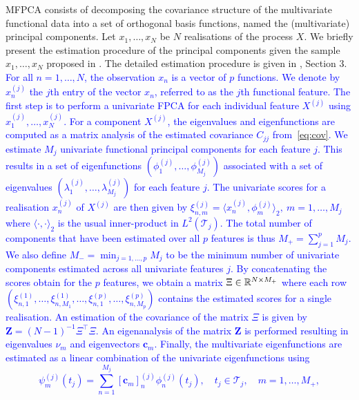 {MFPCA consists of decomposing the covariance structure of the multivariate functional data into a set of orthogonal basis functions, named the (multivariate) principal components. Let $x_1, \dots, x_N$ be $N$ realisations of the process $X$. We briefly present the estimation procedure of the principal components given the sample $x_1, \dots, x_N$ proposed in \cite{happMultivariateFunctionalPrincipal2018}.} The detailed estimation procedure is given in \cite{happMultivariateFunctionalPrincipal2018}, Section 3. \textcolor{blue}{For all $n = 1, \dots, N$, the observation $x_n$ is a vector of $p$ functions. We denote by $x_n^{(j)}$ the $j$th entry of the vector $x_n$, referred to as the $j$th functional feature. The first step is to perform a univariate FPCA for each individual feature $X^{(j)}$ using $x_1^{(j)}, \dots, x_N^{(j)}$. For a component $X^{(j)}$, the eigenvalues and eigenfunctions are computed as a matrix analysis of the estimated covariance $C_{jj}$ from~\eqref{eq:cov}. We estimate $M_j$ univariate functional principal components for each feature $j$. This results in a set of eigenfunctions $(\phi^{(j)}_{1}, \ldots, \phi^{(j)}_{M_j})$ associated with a set of eigenvalues $(\lambda^{(j)}_1, \ldots, \lambda^{(j)}_{M_j})$ for each feature $j$. The univariate scores for a realisation $x^{(j)}_n$ of $X^{(j)}$ are then given by $\xi^{(j)}_{n, m} = \langle  x^{(j)}_n, \phi^{(j)}_m \rangle_2,~m = 1, \ldots, M_j$ where $\langle \cdot, \cdot\rangle_2$ is the usual inner-product in $L^2(\mathcal{T}_j)$. The total number of components that have been estimated over all $p$ features is thus $M_+ = \sum_{j = 1}^p M_j$. We also define $M_{-} = \min_{j = 1, \dots, p} M_j$ to be the minimum number of univariate components estimated across all univariate features $j$. By concatenating the scores obtain for the $p$ features, we obtain a matrix $\Xi \in \mathbb{R}^{N \times M_+}$ where each row $(\xi^{(1)}_{n, 1}, \ldots, \xi^{(1)}_{n, M_1}, \ldots, \xi^{(p)}_{n, 1}, \ldots, \xi^{(p)}_{n, M_p})$ contains the estimated scores for a single realisation. An estimation of the covariance of the matrix $\Xi$ is given by $\mathbf{Z} = (N - 1)^{-1}\Xi^\top\Xi$. An eigenanalysis of the matrix $\mathbf{Z}$ is performed resulting in eigenvalues $\nu_m$ and eigenvectors $\mathbf{c}_m$. Finally, the multivariate eigenfunctions are estimated as a linear combination of the univariate eigenfunctions using
\begin{equation}
    \psi^{(j)}_m(t_j) = \sum_{n = 1}^{M_j}[\mathbf{c}_m]^{(j)}_n \phi^{(j)}_{n}(t_j), \quad t_j \in \mathcal{T}_j, \quad m = 1, \dots, M_+,

\end{equation}}
